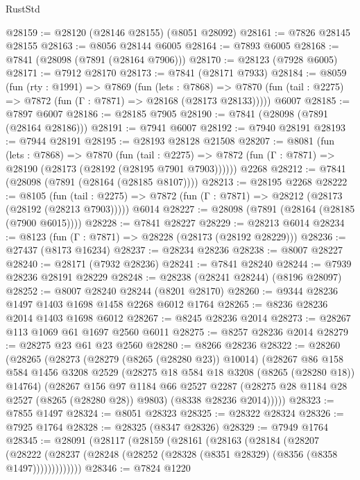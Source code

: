 \begin{lexlean}{RustStd}
\begin{coremodule}
{\begin{coremodule}
{{{{{{{{{{{{{{{{{{{{{{{{{{{{{{{{{{{{{{{{{{{{{{{{{{{{{{@28159 := @28120 (@28146 @28155) (@8051 @28092)
@28161 := @7826 @28145 @28155
@28163 := @8056 @28144 @6005
@28164 := @7893 @6005
@28168 := @7841 (@28098 (@7891 (@28164 @7906)))
@28170 := @28123 (@7928 @6005)
@28171 := @7912 @28170
@28173 := @7841 (@28171 @7933)
@28184 := @8059
    (fun (rty : @1991) =>
    @7869
      (fun (lets : @7868) =>
      @7870 (fun (tail : @2275) => @7872 (fun (Γ : @7871) => @28168 (@28173 @28133)))))
    @6007
@28185 := @7897 @6007
@28186 := @28185 @7905
@28190 := @7841 (@28098 (@7891 (@28164 @28186)))
@28191 := @7941 @6007
@28192 := @7940 @28191
@28193 := @7944 @28191
@28195 := @28193 @28128 @21508
@28207 := @8081
    (fun (lets : @7868) =>
    @7870
      (fun (tail : @2275) =>
      @7872 (fun (Γ : @7871) => @28190 (@28173 (@28192 (@28195 @7901 @7903))))))
    @2268
@28212 := @7841 (@28098 (@7891 (@28164 (@28185 @8107))))
@28213 := @28195 @2268
@28222 := @8105
    (fun (tail : @2275) => @7872 (fun (Γ : @7871) => @28212 (@28173 (@28192 (@28213 @7903)))))
    @6014
@28227 := @28098 (@7891 (@28164 (@28185 (@7900 @6015))))
@28228 := @7841 @28227
@28229 := @28213 @6014
@28234 := @8123 (fun (Γ : @7871) => @28228 (@28173 (@28192 @28229)))
@28236 := @27437 (@8173 @16234)
@28237 := @28234 @28236
@28238 := @8007 @28227
@28240 := @28171 (@7932 @28236)
@28241 := @7841 @28240
@28244 := @7939 @28236 @28191 @28229
@28248 := @28238 (@28241 @28244) (@8196 @28097)
@28252 := @8007 @28240 @28244 (@8201 @28170)
@28260 := @9344 @28236 @1497 @1403 @1698 @1458 @2268 @6012 @1764
@28265 := @8236 @28236 @2014 @1403 @1698 @6012
@28267 := @8245 @28236 @2014
@28273 := @28267 @113 @1069 @61 @1697 @2560 @6011
@28275 := @8257 @28236 @2014
@28279 := @28275 @23 @61 @23 @2560
@28280 := @8266 @28236
@28322 := @28260
    (@28265
      (@28273
        (@28279 (@8265 (@28280 @23)) @10014)
        (@28267
          @86
          @158
          @584
          @1456
          @3208
          @2529
          (@28275 @18 @584 @18 @3208 (@8265 (@28280 @18)) @14764)
          (@28267
            @156
            @97
            @1184
            @66
            @2527
            @2287
            (@28275 @28 @1184 @28 @2527 (@8265 (@28280 @28)) @9803)
            (@8338 @28236 @2014)))))
@28323 := @7855 @1497
@28324 := @8051 @28323
@28325 := @28322 @28324
@28326 := @7925 @1764
@28328 := @28325 (@8347 @28326)
@28329 := @7949 @1764
@28345 := @28091
    (@28117
      (@28159
        (@28161
          (@28163
            (@28184
              (@28207
                (@28222
                  (@28237 (@28248 (@28252 (@28328 (@8351 @28329) (@8356 (@8358 @1497)))))))))))))
@28346 := @7824 @1220
}}}}}}}}}}}}}}}}}}}}}}}}}}}}}}}}}}}}}}}}}}}}}}}}}}}}}}
\end{coremodule}}
\end{coremodule}
\end{lexlean}

